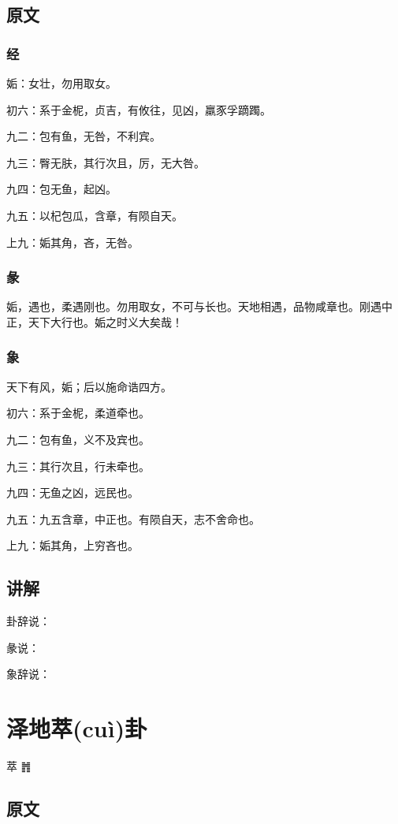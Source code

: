 \documentclass[12pt,oneside]{book}
\begin{document}
\section{原文}

\subsection{经}
姤：女壮，勿用取女。

初六：系于金柅，贞吉，有攸往，见凶，羸豕孚蹢躅。

九二：包有鱼，无咎，不利宾。

九三：臀无肤，其行次且，厉，无大咎。

九四：包无鱼，起凶。

九五：以杞包瓜，含章，有陨自天。

上九：姤其角，吝，无咎。


\subsection{彖}
姤，遇也，柔遇刚也。勿用取女，不可与长也。天地相遇，品物咸章也。刚遇中正，天下大行也。姤之时义大矣哉！

\subsection{象}
天下有风，姤；后以施命诰四方。

初六：系于金柅，柔道牵也。

九二：包有鱼，义不及宾也。

九三：其行次且，行未牵也。

九四：无鱼之凶，远民也。

九五：九五含章，中正也。有陨自天，志不舍命也。

上九：姤其角，上穷吝也。


\section{讲解}
卦辞说：

彖说：

象辞说：


\chapter{泽地萃(cuì)卦}
萃 {\Large ䷬}
\section{原文}
\end{document}

